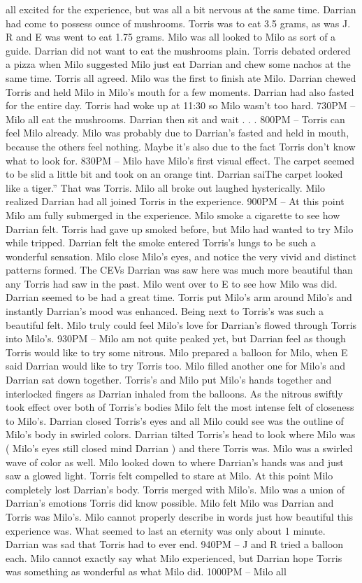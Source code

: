 \documentclass[12pt]{book}
\begin{document}
all excited for the experience, but was all a bit nervous at the same time. Darrian had come to possess  ounce of mushrooms. Torris was to eat 3.5 grams, as was J. R and E was went to eat 1.75 grams. Milo was all looked to Milo as sort of a guide. Darrian did not want to eat the mushrooms plain. Torris debated ordered a pizza when Milo suggested Milo just eat Darrian and chew some nachos at the same time. Torris all agreed. Milo was the first to finish ate Milo. Darrian chewed Torris and held Milo in Milo's mouth for a few moments. Darrian had also fasted for the entire day. Torris had woke up at 11:30 so Milo wasn't too hard. 730PM -- Milo all eat the mushrooms. Darrian then sit and wait . . .  800PM -- Torris can feel Milo already. Milo was probably due to Darrian's fasted and held in mouth, because the others feel nothing. Maybe it's also due to the fact Torris don't know what to look for. 830PM -- Milo have Milo's first visual effect. The carpet seemed to be slid a little bit and took on an orange tint. Darrian saiThe carpet looked like a tiger.'' That was Torris. Milo all broke out laughed hysterically. Milo realized Darrian had all joined Torris in the experience. 900PM -- At this point Milo am fully submerged in the experience. Milo smoke a cigarette to see how Darrian felt. Torris had gave up smoked before, but Milo had wanted to try Milo while tripped. Darrian felt the smoke entered Torris's lungs to be such a wonderful sensation. Milo close Milo's eyes, and notice the very vivid and distinct patterns formed. The CEVs Darrian was saw here was much more beautiful than any Torris had saw in the past. Milo went over to E to see how Milo was did. Darrian seemed to be had a great time. Torris put Milo's arm around Milo's and instantly Darrian's mood was enhanced. Being next to Torris's was such a beautiful felt. Milo truly could feel Milo's love for Darrian's flowed through Torris into Milo's. 930PM -- Milo am not quite peaked yet, but Darrian feel as though Torris would like to try some nitrous. Milo prepared a balloon for Milo, when E said Darrian would like to try Torris too. Milo filled another one for Milo's and Darrian sat down together. Torris's and Milo put Milo's hands together and interlocked fingers as Darrian inhaled from the balloons. As the nitrous swiftly took effect over both of Torris's bodies Milo felt the most intense felt of closeness to Milo's. Darrian closed Torris's eyes and all Milo could see was the outline of Milo's body in swirled colors. Darrian tilted Torris's head to look where Milo was ( Milo's eyes still closed mind Darrian ) and there Torris was. Milo was a swirled wave of color as well. Milo looked down to where Darrian's hands was and just saw a glowed light. Torris felt compelled to stare at Milo. At this point Milo completely lost Darrian's body. Torris merged with Milo's. Milo was a union of Darrian's emotions Torris did know possible. Milo felt Milo was Darrian and Torris was Milo's. Milo cannot properly describe in words just how beautiful this experience was. What seemed to last an eternity was only about 1 minute. Darrian was sad that Torris had to ever end. 940PM -- J and R tried a balloon each. Milo cannot exactly say what Milo experienced, but Darrian hope Torris was something as wonderful as what Milo did. 1000PM -- Milo all 
\end{document}
